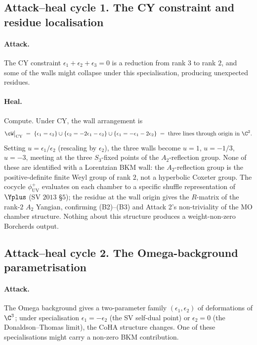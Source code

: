 \subsection*{Attack--heal cycle 1.  The CY constraint and residue localisation}

\paragraph{Attack.} The CY constraint $\epsilon_1 + \epsilon_2 +
\epsilon_3 = 0$ is a reduction from rank $3$ to rank $2$, and some
of the walls might collapse under this specialisation, producing
unexpected residues.

\paragraph{Heal.} Compute. Under CY, the wall arrangement is
\[
 \cW \big|_{\mathrm{CY}} \;=\;
 \{\epsilon_1 = \epsilon_2\} \cup \{\epsilon_2 = -2\epsilon_1
 - \epsilon_2\} \cup \{\epsilon_1 = -\epsilon_1 - 2 \epsilon_2\}
 \;=\; \text{three lines through origin in } \C^2.
\]
Setting $u = \epsilon_1 / \epsilon_2$ (rescaling by $\epsilon_2$),
the three walls become $u = 1$, $u = -1/3$, $u = -3$, meeting at
the three $S_3$-fixed points of the $A_2$-reflection group.
None of these are identified with a Lorentzian BKM wall:
the $A_2$-reflection group is the positive-definite finite Weyl
group of rank $2$, not a hyperbolic Coxeter group. The cocycle
$\phi^+_{\mathrm{UV}}$ evaluates on each chamber to a specific
shuffle representation of $\Yplus$ (SV $2013$ \S $5$); the residue
at the wall origin gives the $R$-matrix of the rank-$2$ $A_2$
Yangian, confirming (B2)--(B3) and Attack 2's non-triviality of
the MO chamber structure. Nothing about this structure produces
a weight-non-zero Borcherds output.

\subsection*{Attack--heal cycle 2.  The Omega-background parametrisation}

\paragraph{Attack.} The Omega background gives a two-parameter
family $(\epsilon_1, \epsilon_2)$ of deformations of $\C^3$; under
specialisation $\epsilon_1 = -\epsilon_2$ (the SV self-dual point)
or $\epsilon_2 = 0$ (the Donaldson--Thomas limit), the CoHA
structure changes. One of these specialisations might carry
a non-zero BKM contribution.

